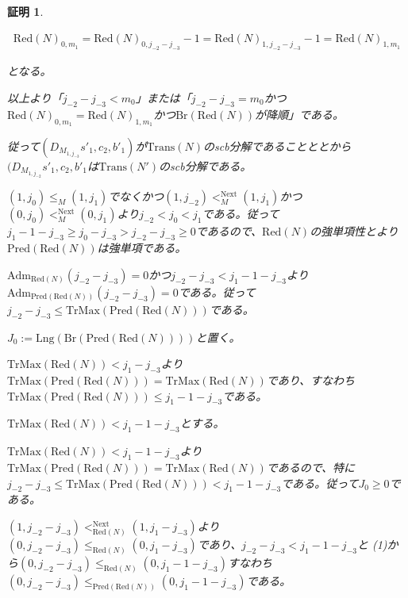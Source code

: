 \documentclass[dvipdfmx,uplatex]{jsarticle}
\theoremstyle{customnonumberbreakfortheorem}
\theoremstyle{customnonumberbreakforproof}
\newtheorem{hideableproof}{証明}
\begin{document}
\begin{hideableproof}
\begin{indented}
\begin{indented}
			\begin{eqnarray*}
			\textrm{Red}(N)_{0,m_1} = \textrm{Red}(N)_{0,j_{-2}-j_{-3}}-1 = \textrm{Red}(N)_{1,j_{-2}-j_{-3}}-1 = \textrm{Red}(N)_{1,m_1}
			\end{eqnarray*}
			\item となる。
		\end{indented}
		\item 以上より「\(j_{-2}-j_{-3} < m_0\)」または「\(j_{-2}-j_{-3} = m_0\)かつ\(\textrm{Red}(N)_{0,m_1} = \textrm{Red}(N)_{1,m_1}\)かつ\(\textrm{Br}(\textrm{Red}(N))\)が降順」である。
		\item 従って\((D_{M_{1,j_{-3}}} s'_1,c_2,b'_1)\)が\(\textrm{Trans}(N)\)のscb分解であることととから\((D_{M_{1,j_{-2}}} s'_1,c_2,b'_1\)は\(\textrm{Trans}(N')\)のscb分解である。
		\item
		\item \((1,j_0) \leq_M (1,j_1)\)でなくかつ\((1,j_{-2}) <_M^{\textrm{Next}} (1,j_1)\)かつ\((0,j_0) <_M^{\textrm{Next}} (0,j_1)\)より\(j_{-2} < j_0 < j_1\)である。従って\(j_1-1-j_{-3} \geq j_0-j_{-3} > j_{-2}-j_{-3} \geq 0\)であるので、\(\textrm{Red}(N)\)の強単項性とより\(\textrm{Pred}(\textrm{Red}(N))\)は強単項である。
		\item \(\textrm{Adm}_{\textrm{Red}(N)}(j_{-2}-j_{-3}) = 0\)かつ\(j_{-2}-j_{-3} < j_1-1-j_{-3}\)より\(\textrm{Adm}_{\textrm{Pred}(\textrm{Red}(N))}(j_{-2}-j_{-3}) = 0\)である。従って\(j_{-2}-j_{-3} \leq \textrm{TrMax}(\textrm{Pred}(\textrm{Red}(N)))\)である。
		\item \(J_0 := \textrm{Lng}(\textrm{Br}(\textrm{Pred}(\textrm{Red}(N))))\)と置く。
		\item \(\textrm{TrMax}(\textrm{Red}(N)) < j_1-j_{-3}\)より\(\textrm{TrMax}(\textrm{Pred}(\textrm{Red}(N))) = \textrm{TrMax}(\textrm{Red}(N))\)であり、すなわち\(\textrm{TrMax}(\textrm{Pred}(\textrm{Red}(N))) \leq j_1-1-j_{-3}\)である。
		\item \(\textrm{TrMax}(\textrm{Red}(N)) < j_1-1-j_{-3}\)とする。
		\begin{indented}
			\item \(\textrm{TrMax}(\textrm{Red}(N)) < j_1-1-j_{-3}\)より\(\textrm{TrMax}(\textrm{Pred}(\textrm{Red}(N))) = \textrm{TrMax}(\textrm{Red}(N))\)であるので、特に\(j_{-2}-j_{-3} \leq \textrm{TrMax}(\textrm{Pred}(\textrm{Red}(N))) < j_1-1-j_{-3}\)である。従って\(J_0 \geq 0\)である。
			\item \((1,j_{-2}-j_{-3}) <_{\textrm{Red}(N)}^{\textrm{Next}} (1,j_1-j_{-3})\)より\((0,j_{-2}-j_{-3}) \leq_{\textrm{Red}(N)} (0,j_1-j_{-3})\)であり、\(j_{-2}-j_{-3} < j_1-1-j_{-3}\)と (1)から\((0,j_{-2}-j_{-3}) \leq_{\textrm{Red}(N)} (0,j_1-1-j_{-3})\)すなわち\((0,j_{-2}-j_{-3}) \leq_{\textrm{Pred}(\textrm{Red}(N))} (0,j_1-1-j_{-3})\)である。

\end{indented}
\end{indented}
\end{hideableproof}
\end{document}
